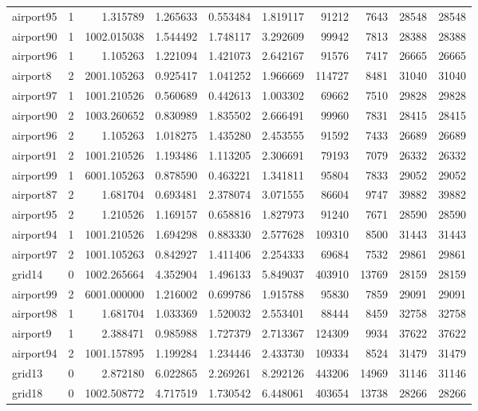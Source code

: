 \begin{longtable}{|l|r|r|r|r|r|r|r|r|r|}
airport95 & 1 & 1.315789 & 1.265633 & 0.553484 & 1.819117 & 91212 & 7643 & 28548 & 28548 \\
airport90 & 1 & 1002.015038 & 1.544492 & 1.748117 & 3.292609 & 99942 & 7813 & 28388 & 28388 \\
airport96 & 1 & 1.105263 & 1.221094 & 1.421073 & 2.642167 & 91576 & 7417 & 26665 & 26665 \\
airport8 & 2 & 2001.105263 & 0.925417 & 1.041252 & 1.966669 & 114727 & 8481 & 31040 & 31040 \\
airport97 & 1 & 1001.210526 & 0.560689 & 0.442613 & 1.003302 & 69662 & 7510 & 29828 & 29828 \\
airport90 & 2 & 1003.260652 & 0.830989 & 1.835502 & 2.666491 & 99960 & 7831 & 28415 & 28415 \\
airport96 & 2 & 1.105263 & 1.018275 & 1.435280 & 2.453555 & 91592 & 7433 & 26689 & 26689 \\
airport91 & 2 & 1001.210526 & 1.193486 & 1.113205 & 2.306691 & 79193 & 7079 & 26332 & 26332 \\
airport99 & 1 & 6001.105263 & 0.878590 & 0.463221 & 1.341811 & 95804 & 7833 & 29052 & 29052 \\
airport87 & 2 & 1.681704 & 0.693481 & 2.378074 & 3.071555 & 86604 & 9747 & 39882 & 39882 \\
airport95 & 2 & 1.210526 & 1.169157 & 0.658816 & 1.827973 & 91240 & 7671 & 28590 & 28590 \\
airport94 & 1 & 1001.210526 & 1.694298 & 0.883330 & 2.577628 & 109310 & 8500 & 31443 & 31443 \\
airport97 & 2 & 1001.105263 & 0.842927 & 1.411406 & 2.254333 & 69684 & 7532 & 29861 & 29861 \\
grid14 & 0 & 1002.265664 & 4.352904 & 1.496133 & 5.849037 & 403910 & 13769 & 28159 & 28159 \\
airport99 & 2 & 6001.000000 & 1.216002 & 0.699786 & 1.915788 & 95830 & 7859 & 29091 & 29091 \\
airport98 & 1 & 1.681704 & 1.033369 & 1.520032 & 2.553401 & 88444 & 8459 & 32758 & 32758 \\
airport9 & 1 & 2.388471 & 0.985988 & 1.727379 & 2.713367 & 124309 & 9934 & 37622 & 37622 \\
airport94 & 2 & 1001.157895 & 1.199284 & 1.234446 & 2.433730 & 109334 & 8524 & 31479 & 31479 \\
grid13 & 0 & 2.872180 & 6.022865 & 2.269261 & 8.292126 & 443206 & 14969 & 31146 & 31146 \\
grid18 & 0 & 1002.508772 & 4.717519 & 1.730542 & 6.448061 & 403654 & 13738 & 28266 & 28266 \\

\end{longtable}
